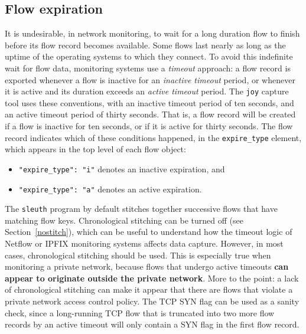 \documentclass{book}
\begin{document}
\subsection{Flow expiration}
\label{expiration}
It is undesirable, in network monitoring, to wait for a long duration
flow to finish before its flow record becomes available.  Some flows
last nearly as long as the uptime of the operating systems to which
they connect.  To avoid this indefinite wait for flow data, monitoring
systems use a \textit{timeout} approach: a flow record is exported
whenever a flow is inactive for an \textit{inactive timeout} period,
or whenever it is active and its duration exceeds an \textit{active
  timeout} period.  The \texttt{joy} capture tool uses these
conventions, with an inactive timeout period of ten seconds, and an
active timeout period of thirty seconds.  That is, a flow record will
be created if a flow is inactive for ten seconds, or if it is active
for thirty seconds.  The flow record indicates which of these
conditions happened, in the \texttt{expire\_type} element, which
appears in the top level of each flow object:
\begin{itemize}
  \item \texttt{"expire\_type": "i"} denotes an inactive expiration, and
  \item \texttt{"expire\_type": "a"} denotes an active expiration.
\end{itemize}
The \texttt{sleuth} program by default stitches together successive
flows that have matching flow keys.  Chronological stitching can be
turned off (see Section~\ref{nostitch}), which can be useful to
understand how the timeout logic of Netflow or IPFIX monitoring
systems affects data capture.  However, in most cases, chronological
stitching should be used.  This is especially true when monitoring a
private network, because flows that undergo active timeouts
\textbf{can appear to originate outside the private network}.  More to
the point: a lack of chronological stitching can make it appear that
there are flows that violate a private network access control policy.
The TCP SYN flag can be used as a sanity check, since a long-running
TCP flow that is truncated into two more flow records by an active
timeout will only contain a SYN flag in the first flow record.
\end{document}
